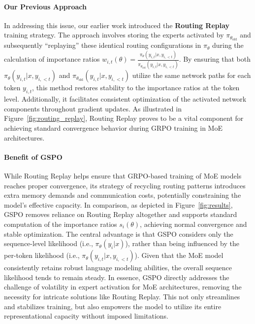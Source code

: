 \paragraph{Our Previous Approach} In addressing this issue, our earlier work introduced the \textbf{Routing Replay} training strategy. The approach involves storing the experts activated by $\pi_{\theta_\text{old}}$ and subsequently ``replaying'' these identical routing configurations in $\pi_{\theta}$ during the calculation of importance ratios $w_{i,t}(\theta) = \frac{ \pi_{\theta} (y_{i,t} | x, y_{i,<t}) }{ \pi_{\theta_\text{old}} (y_{i,t} | x,y_{i,<t})}$. By ensuring that both $\pi_{\theta} (y_{i,t} | x, y_{i,<t})$ and $\pi_{\theta_\text{old}} (y_{i,t} | x,y_{i,<t})$ utilize the same network paths for each token $y_{i,t}$, this method restores stability to the importance ratios at the token level. Additionally, it facilitates consistent optimization of the activated network components throughout gradient updates. As illustrated in Figure~\ref{fig:routing_replay}, Routing Replay proves to be a vital component for achieving standard convergence behavior during GRPO training in MoE architectures.

\paragraph{Benefit of GSPO} While Routing Replay helps ensure that GRPO-based training of MoE models reaches proper convergence, its strategy of recycling routing patterns introduces extra memory demands and communication costs, potentially constraining the model's effective capacity. In comparison, as depicted in Figure~\ref{fig:results}, GSPO removes reliance on Routing Replay altogether and supports standard computation of the importance ratios $s_i(\theta)$, achieving normal convergence and stable optimization. The central advantage is that GSPO considers only the sequence-level likelihood (i.e., $\pi_{\theta} (y_i | x)$), rather than being influenced by the per-token likelihood (i.e., $\pi_{\theta} (y_{i,t} | x, y_{i,<t})$). Given that the MoE model consistently retains robust language modeling abilities, the overall sequence likelihood tends to remain steady. In essence, GSPO directly addresses the challenge of volatility in expert activation for MoE architectures, removing the necessity for intricate solutions like Routing Replay. This not only streamlines and stabilizes training, but also empowers the model to utilize its entire representational capacity without imposed limitations.


